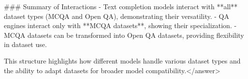 ### Summary of Interactions  
- Text completion models interact with **all** dataset types (MCQA and Open QA), demonstrating their versatility.  
- QA engines interact only with **MCQA datasets**, showing their specialization.  
- MCQA datasets can be transformed into Open QA datasets, providing flexibility in dataset use.  


This structure highlights how different models handle various dataset types and the ability to adapt datasets for broader model compatibility.</answer>